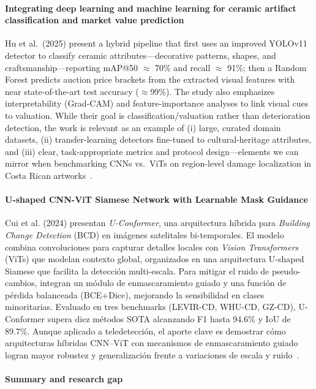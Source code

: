 \documentclass[conference]{IEEEtran}
\begin{document}
\medskip
\paragraph*{Integrating deep learning and machine learning for ceramic artifact classification and market value prediction}
Hu et al.\ (2025) present a hybrid pipeline that first uses an improved YOLOv11 detector to classify ceramic attributes---decorative patterns, shapes, and craftsmanship---reporting mAP@50 $\approx$ 70\% and recall $\approx$ 91\%; then a Random Forest predicts auction price brackets from the extracted visual features with near state-of-the-art test accuracy ($\approx$99\%). The study also emphasizes interpretability (Grad-CAM) and feature-importance analyses to link visual cues to valuation. While their goal is classification/valuation rather than deterioration detection, the work is relevant as an example of (i) large, curated domain datasets, (ii) transfer-learning detectors fine-tuned to cultural-heritage attributes, and (iii) clear, task-appropriate metrics and protocol design---elements we can mirror when benchmarking CNNs vs.\ ViTs on region-level damage localization in Costa Rican artworks~\cite{hu_integrating_2025}.

\medskip
\paragraph*{U-shaped CNN-ViT Siamese Network with Learnable Mask Guidance}
Cui et al. (2024) presentan \textit{U-Conformer}, una arquitectura híbrida para \textit{Building Change Detection} (BCD) en imágenes satelitales bi-temporales. El modelo combina convoluciones para capturar detalles locales con \textit{Vision Transformers} (ViTs) que modelan contexto global, organizados en una arquitectura U-shaped Siamese que facilita la detección multi-escala. Para mitigar el ruido de pseudo-cambios, integran un módulo de enmascaramiento guiado y una función de pérdida balanceada (BCE+Dice), mejorando la sensibilidad en clases minoritarias. Evaluado en tres benchmarks (LEVIR-CD, WHU-CD, GZ-CD), U-Conformer supera diez métodos SOTA alcanzando F1 hasta 94.6\% y IoU de 89.7\%. Aunque aplicado a teledetección, el aporte clave es demostrar cómo arquitecturas híbridas CNN–ViT con mecanismos de enmascaramiento guiado logran mayor robustez y generalización frente a variaciones de escala y ruido~\cite{cui_u-shaped_2024}.


\medskip
\paragraph*{Summary and research gap}
\end{document}
